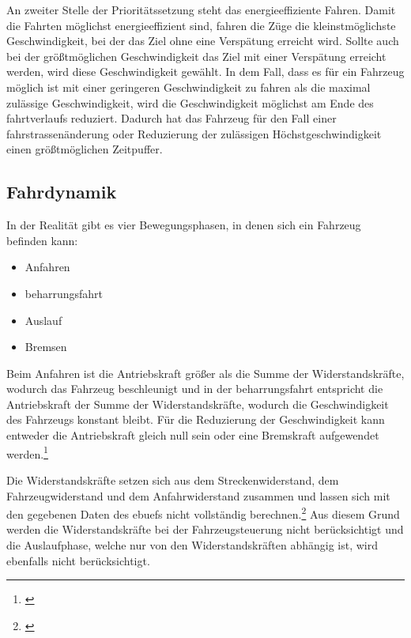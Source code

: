 An zweiter Stelle der Prioritätssetzung steht das energieeffiziente Fahren. Damit die Fahrten möglichst energieeffizient sind, fahren die Züge die kleinstmöglichste Geschwindigkeit, bei der das Ziel ohne eine Verspätung erreicht wird. Sollte auch bei der größtmöglichen Geschwindigkeit das Ziel mit einer Verspätung erreicht werden, wird diese Geschwindigkeit gewählt. In dem Fall, dass es für ein Fahrzeug möglich ist mit einer geringeren Geschwindigkeit zu fahren als die maximal zulässige Geschwindigkeit, wird die Geschwindigkeit möglichst am Ende des \gls{fahrtverlauf}s reduziert. Dadurch hat das Fahrzeug für den Fall einer \gls{fahrstrasse}nänderung oder Reduzierung der zulässigen Höchstgeschwindigkeit einen größtmöglichen Zeitpuffer.
\subsection{Fahrdynamik}
In der Realität gibt es vier Bewegungsphasen, in denen sich ein Fahrzeug befinden kann:
\begin{itemize}
\item Anfahren
\item \Gls{beharrungsfahrt}
\item Auslauf
\item Bremsen
\end{itemize}
Beim Anfahren ist die Antriebskraft größer als die Summe der Widerstandskräfte, wodurch das Fahrzeug beschleunigt und in der \Gls{beharrungsfahrt} entspricht die Antriebskraft der Summe der Widerstandskräfte, wodurch die Geschwindigkeit des Fahrzeugs konstant bleibt. Für die Reduzierung der Geschwindigkeit kann entweder die Antriebskraft gleich null sein oder eine Bremskraft aufgewendet werden.\footnote{\citet[S. 23 ff.]{pachl1999systemtechnik}}

Die Widerstandskräfte setzen sich aus dem Streckenwiderstand, dem Fahrzeugwiderstand und dem Anfahrwiderstand zusammen und lassen sich mit den gegebenen Daten des \ac{ebuef}s nicht vollständig berechnen.\footnote{\citet[S. 25 ff.]{pachl1999systemtechnik}} Aus diesem Grund werden die Widerstandskräfte bei der Fahrzeugsteuerung nicht berücksichtigt und die Auslaufphase, welche nur von den Widerstandskräften abhängig ist, wird ebenfalls nicht berücksichtigt.
